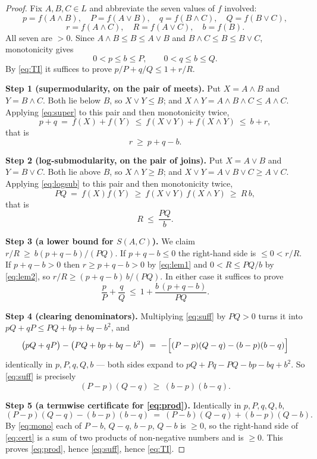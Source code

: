 \documentclass[11pt]{amsart}
\theoremstyle{remark}
\newcommand{\Lat}{L}
\begin{document}
\begin{proof}
Fix $A,B,C\in \Lat$ and abbreviate the seven values of $f$ involved:
\[
 p=f(A\wedge B),\quad P=f(A\vee B),\quad
 q=f(B\wedge C),\quad Q=f(B\vee C),
\]
\[
 r=f(A\wedge C),\quad R=f(A\vee C),\quad
 b=f(B).
\]
All seven are $>0$. Since $A\wedge B\le B\le A\vee B$ and
$B\wedge C\le B\le B\vee C$, monotonicity gives
\begin{equation}\label{eq:mono}
 0<p\le b\le P,
 \qquad
 0<q\le b\le Q .
\end{equation}
By \eqref{eq:TI} it suffices to prove $p/P+q/Q\le 1+r/R$.

\smallskip
\noindent\textbf{Step 1 (supermodularity, on the pair of meets).}
Put $X=A\wedge B$ and $Y=B\wedge C$. Both lie below $B$, so $X\vee Y\le B$;
and $X\wedge Y=A\wedge B\wedge C\le A\wedge C$. Applying \eqref{eq:super} to
this pair and then monotonicity twice,
\[
 p+q\ =\ f(X)+f(Y)\ \le\ f(X\vee Y)+f(X\wedge Y)\ \le\ b+r,
\]
that is
\begin{equation}\label{eq:lem1}
 r\ \ge\ p+q-b .
\end{equation}

\smallskip
\noindent\textbf{Step 2 (log-submodularity, on the pair of joins).}
Put $X=A\vee B$ and $Y=B\vee C$. Both lie above $B$, so $X\wedge Y\ge B$; and
$X\vee Y=A\vee B\vee C\ge A\vee C$. Applying \eqref{eq:logsub} to this pair
and then monotonicity twice,
\[
 PQ\ =\ f(X)f(Y)\ \ge\ f(X\vee Y)\,f(X\wedge Y)\ \ge\ R\,b,
\]
that is
\begin{equation}\label{eq:lem2}
 R\ \le\ \frac{PQ}{b}.
\end{equation}

\smallskip
\noindent\textbf{Step 3 (a lower bound for $S(A,C)$).}
We claim $r/R\ \ge\ b(p+q-b)/(PQ)$. If $p+q-b\le 0$ the right-hand side is
$\le0<r/R$. If $p+q-b>0$ then $r\ge p+q-b>0$ by \eqref{eq:lem1} and
$0<R\le PQ/b$ by \eqref{eq:lem2}, so
$r/R\ge (p+q-b)\,b/(PQ)$. In either case it suffices to prove
\begin{equation}\label{eq:suff}
 \frac{p}{P}+\frac{q}{Q}\ \le\ 1+\frac{b\,(p+q-b)}{PQ}.
\end{equation}

\smallskip
\noindent\textbf{Step 4 (clearing denominators).}
Multiplying \eqref{eq:suff} by $PQ>0$ turns it into
$pQ+qP\le PQ+bp+bq-b^2$, and
\[
 \bigl(pQ+qP\bigr)-\bigl(PQ+bp+bq-b^{2}\bigr)
 \ =\ -\Bigl[(P-p)(Q-q)-(b-p)(b-q)\Bigr]
\]
identically in $p,P,q,Q,b$ --- both sides expand to
$pQ+Pq-PQ-bp-bq+b^{2}$. So \eqref{eq:suff} is precisely
\begin{equation}\label{eq:prod}
 (P-p)(Q-q)\ \ge\ (b-p)(b-q).
\end{equation}

\smallskip
\noindent\textbf{Step 5 (a termwise certificate for \eqref{eq:prod}).}
Identically in $p,P,q,Q,b$,
\begin{equation}\label{eq:cert}
 (P-p)(Q-q)-(b-p)(b-q)\ =\ (P-b)(Q-q)+(b-p)(Q-b).
\end{equation}
By \eqref{eq:mono} each of $P-b$, $Q-q$, $b-p$, $Q-b$ is $\ge0$, so the
right-hand side of \eqref{eq:cert} is a sum of two products of non-negative
numbers and is $\ge0$. This proves \eqref{eq:prod}, hence \eqref{eq:suff},
hence \eqref{eq:TI}.
\end{proof}
\end{document}
